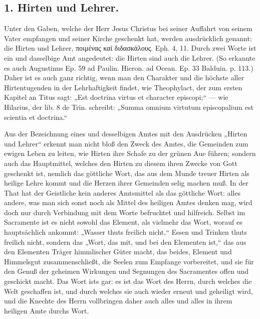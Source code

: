 \subsection*{1. Hirten und Lehrer.}

Unter den Gaben, welche der Herr Jesus Christus bei seiner Auffahrt von seinem Vater empfangen und seiner Kirche geschenkt hat, werden ausdrücklich genannt: die Hirten und Lehrer, ποιμένας καὶ διδασκάλους. Eph. 4, 11. Durch zwei Worte ist ein und dasselbige Amt angedeutet: die Hirten sind auch die Lehrer. (So erkannte es auch Augustinus Ep. 59 ad Paulin. Hieron. ad Ocean. Ep. 33 Balduin. p. 113.) Daher ist es auch ganz richtig, wenn man den Charakter und die höchste aller Hirtentugenden in der Lehrhaftigkeit findet, wie Theophylact, der zum ersten Kapitel an Titus sagt: „Est doctrina virtus et character episcopi;“ — wie Hilarius, der lib. 8 de Trin. schreibt: „Summa omnium virtutum episcopalium est scientia et doctrina.“

Aus der Bezeichnung eines und desselbigen Amtes mit den Ausdrücken „Hirten und Lehrer“ erkennt man nicht bloß den Zweck des Amtes, die Gemeinden zum ewigen Leben zu leiten, wie Hirten ihre Schafe zu der grünen Aue führen; sondern auch das Hauptmittel, welches den Hirten zu diesem ihren Zwecke von Gott geschenkt ist, nemlich das göttliche Wort, das aus dem Munde treuer Hirten als heilige Lehre kommt
und die Herzen ihrer Gemeinden selig machen muß. In der That hat der Geistliche kein anderes Amtsmittel als das göttliche Wort: alles andere, was man sich sonst noch als Mittel des heiligen Amtes denken mag, wird doch nur durch Verbindung mit dem Worte befruchtet und hilfreich. Selbst im Sacramente ist es nicht sowohl das Element, als vielmehr das Wort, worauf es hauptsächlich ankommt: „Wasser thuts freilich nicht,“ Essen und Trinken thuts freilich nicht, sondern das „Wort, das mit, und bei den Elementen ist,“ das aus den Elementen Träger himmlischer Güter macht, das beides, Element und Himmelsgut zusammenschließt, die Seelen zum Empfange vorbereitet, und sie für den Genuß der geheimen Wirkungen und Segnungen des Sacramentes offen und geschickt macht. Das Wort ists gar: es ist das Wort des Herrn, durch welches die Welt geschaffen ist, und durch welches sie auch wieder erneut und geheiligt wird, und die Knechte des Herrn vollbringen daher auch alles und alles in ihrem heiligen Amte durchs Wort.

